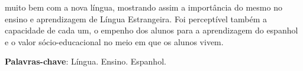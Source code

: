 \documentclass[article,12pt,onesidea,4paper,english,brazil]{abntex2}
\begin{document}
muito bem com a nova língua, mostrando assim a importância do mesmo no ensino e aprendizagem de Língua Estrangeira. Foi perceptível também a capacidade de cada um, o empenho dos alunos para a aprendizagem do espanhol e o valor sócio-educacional no meio em que os alunos vivem.
	
	\vspace{\onelineskip}
	
	\noindent
	\textbf{Palavras-chave}: Língua. Ensino. Espanhol.
	
\end{document}
